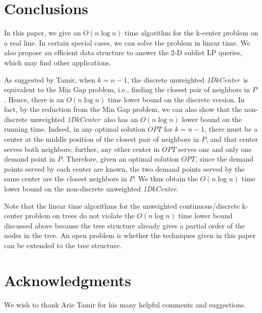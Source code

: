 \documentclass{llncs}
\def\problem{{\it 1DkCenter}}
\begin{document}
\section{Conclusions}
\label{sec:conclusion}

In this paper, we give an $O(n\log n)$ time algorithm for the k-center
problem on a real line. In certain special cases, we can solve the
problem in linear time.
We also propose an efficient data structure to answer the 2-D sublist LP queries, which may find other applications.

As suggested by Tamir,
when $k=n-1$, the discrete unweighted \problem\ is equivalent to the Min
Gap problem, i.e., finding the closest pair of neighbors in $P$.
Hence, there is an $O(n\log n)$ time lower bound on the discrete
version. In fact, by the reduction from the Min Gap problem, we can
also show that the non-discrete unweighted \problem\ also has an
$O(n\log n)$ lower bound on the running time. Indeed, in any optimal
solution $OPT$ for $k=n-1$, there must be a
center at the middle position of the closest pair of neighbors in $P$,
and that center serves both neighbors; further, any
other center in $OPT$ serves one and only one demand point in $P$.
Therefore, given an optimal solution $OPT$, since the demand points
served by each center are known, the two demand points served by the
same center are the closest neighbors in $P$. We thus obtain the
$O(n\log n)$ time lower bound on the non-discrete unweighted \problem.


Note that the linear time algorithms for the unweighted
continuous/discrete k-center
problem on trees \cite{ref:FredericksonPa91} do not violate the
$O(n\log n)$ time lower
bound discussed above because the tree
structure already gives a partial order of the nodes in the tree.
An open problem is whether the techniques given in this paper can be
extended to the tree structure.


\section*{Acknowledgments}

We wish to thank Arie Tamir for his many helpful comments and suggestions.





\footnotesize \baselineskip=11.0pt

\end{document}

